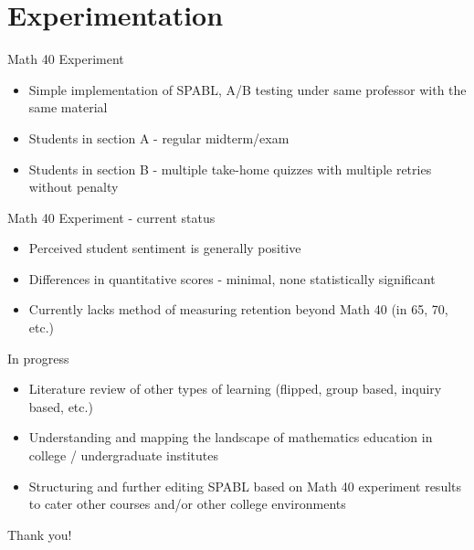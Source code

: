 \documentclass{beamer}
\begin{document}
\section{Experimentation}
\begin{frame}{Math 40 Experiment}\pause
  \begin{itemize}
    \item Simple implementation of SPABL, A/B testing under same professor with the same material
    \item Students in section A - regular midterm/exam
    \item Students in section B - multiple take-home quizzes with multiple retries without penalty
  \end{itemize}
\end{frame}
\begin{frame}{Math 40 Experiment - current status}\pause
  \begin{itemize}
    \item Perceived student sentiment is generally positive \pause
    \item Differences in quantitative scores - minimal, none statistically significant \pause
    \item Currently lacks method of measuring retention beyond Math 40 (in 65, 70, etc.)
  \end{itemize}
\end{frame}
\begin{frame}{In progress}
  \begin{itemize}
    \item Literature review of other types of learning (flipped, group based, inquiry based, etc.)
    \item Understanding and mapping the landscape of mathematics education in college / undergraduate institutes
    \item Structuring and further editing SPABL based on Math 40 experiment results to cater other courses and/or other college environments
  \end{itemize}
\end{frame}
\begin{frame}{Thank you!}
\end{frame}
\end{document}

